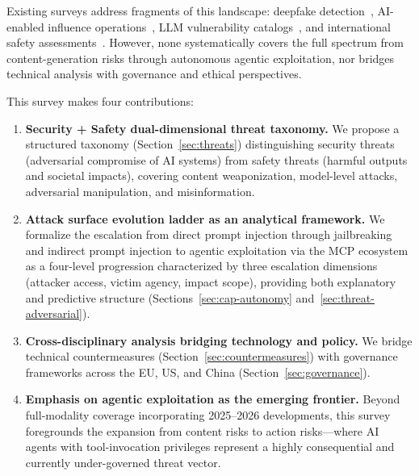 
Existing surveys address fragments of this landscape: deepfake detection~\cite{pei2024deepfakesurvey}, AI-enabled influence operations~\cite{spitale2023gpt3}, LLM vulnerability catalogs~\cite{owasp2025}, and international safety assessments~\cite{aisafetyreport2025,aisafetyreport2026}. However, none systematically covers the full spectrum from content-generation risks through autonomous agentic exploitation, nor bridges technical analysis with governance and ethical perspectives.

This survey makes four contributions:
\begin{enumerate}[nosep,leftmargin=1.5em]
    \item \textbf{Security + Safety dual-dimensional threat taxonomy.} We propose a structured taxonomy (Section~\ref{sec:threats}) distinguishing security threats (adversarial compromise of AI systems) from safety threats (harmful outputs and societal impacts), covering content weaponization, model-level attacks, adversarial manipulation, and misinformation.
    \item \textbf{Attack surface evolution ladder as an analytical framework.} We formalize the escalation from direct prompt injection through jailbreaking and indirect prompt injection to agentic exploitation via the MCP ecosystem as a four-level progression characterized by three escalation dimensions (attacker access, victim agency, impact scope), providing both explanatory and predictive structure (Sections~\ref{sec:cap-autonomy} and~\ref{sec:threat-adversarial}).
    \item \textbf{Cross-disciplinary analysis bridging technology and policy.} We bridge technical countermeasures (Section~\ref{sec:countermeasures}) with governance frameworks across the EU, US, and China (Section~\ref{sec:governance}).
    \item \textbf{Emphasis on agentic exploitation as the emerging frontier.} Beyond full-modality coverage incorporating 2025--2026 developments, this survey foregrounds the expansion from content risks to action risks---where AI agents with tool-invocation privileges represent a highly consequential and currently under-governed threat vector.
\end{enumerate}


